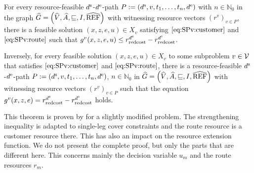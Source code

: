 \begin{theorem}
\label{th:equivalence_SPv_MMILP}

For every resource-feasible $d^{\operatorname{s}}$-$d^{\operatorname{e}}$-path ${P:=\left(d^{\operatorname{s}},v,t_1,\dots,t_n,d^{\operatorname{e}}\right)}$ with $n\in\mathbb{N}_0$ in the graph ${\widehat{G}=\left(\widehat{V},\widehat{A},\sqsubseteq,I,\widehat{\operatorname{REF}}\right)}$ with witnessing resource vectors $\left(r^v\right)_{v\in P}$, there is a feasible solution ${(x,z,e,u)\in X_v}$ satisfying $\eqref{eq:SPv:customer}$ and $\eqref{eq:SPv:route}$ such that ${g^v(x,z,e,u)\leq r^{d^{\operatorname{e}}}_{\operatorname{redcost}} - r^{d^{\operatorname{s}}}_{\operatorname{redcost}}}$.

Inversely, for every feasible solution ${(x,z,e,u)\in X_v}$ to some subproblem $v\in\mathcal{V}$ that satisfies $\eqref{eq:SPv:customer}$ and $\eqref{eq:SPv:route}$, there is a resource-feasible $d^{\operatorname{s}}$-$d^{\operatorname{e}}$-path ${P:=\left(d^{\operatorname{s}},v,t_1,\dots,t_n,d^{\operatorname{e}}\right)}$, $n\in\mathbb{N}_0$ in ${\widehat{G}=\left(\widehat{V},\widehat{A},\sqsubseteq,I,\widehat{\operatorname{REF}}\right)}$ with witnessing resource vectors $\left(r^v\right)_{v\in P}$ such that the equation ${g^v(x,z,e)=r^{d^{\operatorname{e}}}_{\operatorname{redcost}} - r^{d^{\operatorname{s}}}_{\operatorname{redcost}}}$ holds.

\end{theorem}

This theorem is proven by \cite[pp.~96-99]{Kaiser} for a slightly modified problem. The strengthening inequality is adapted to single-leg cover constraints and the route resource is a customer resource there. This has also an impact on the resource extension function. We do not present the complete proof, but only the parts that are different here. This concerns mainly the decision variable $u_m$ and the route resources $r_m$.


